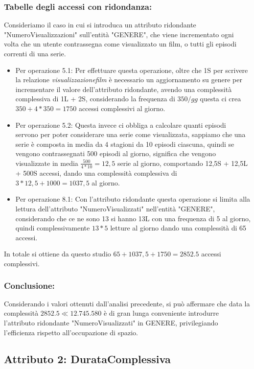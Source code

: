 \documentclass[a4paper,12pt]{report}
\begin{document}
\subsubsection{Tabelle degli accessi con ridondanza:}
Consideriamo il caso in cui si introduca un attributo ridondante "NumeroVisualizzazioni" sull'entità "GENERE", che viene incrementato ogni volta che un utente contrassegna come visualizzato un film, o tutti gli episodi correnti di una serie.
\begin{itemize}
	\item Per operazione 5.1: Per effettuare questa operazione, oltre che 1S per scrivere la relazione \textit{visualizzazionefilm} è necessario un aggiornamento su genere per incrementare il valore dell'attributo ridondante, avendo una complessità complessiva di 1L + 2S, considerando la frequenza di $350/gg$ questa ci crea $350 + 4 * 350 = 1750$ accessi complessivi al giorno.
	\item Per operazione 5.2: Questa invece ci obbliga a calcolare quanti episodi servono per poter considerare una serie come visualizzata, sappiamo che una serie è composta in media da 4 stagioni da 10 episodi ciascuna, quindi se vengono contrassegnati 500 episodi al giorno, significa che vengono visualizzate in media $\frac{500}{4 * 10} = 12,5$ serie al giorno, comportando 12,5S + 12,5L + 500S accessi, dando una complessità complessiva di $3 * 12,5 + 1000 = 1037,5$ al giorno.
	\item Per operazione 8.1: Con l'attributo ridondante questa operazione si limita alla lettura dell'attributo "NumeroVisualizzati" nell'entità "GENERE", considerando che ce ne sono 13 si hanno 13L con una frequenza di 5 al giorno, quindi complessivamente $13 * 5$ letture al giorno dando una complessità di 65 accessi.
\end{itemize}
In totale si ottiene da questo studio $65 + 1037,5 + 1750 = 2852.5$ accessi complessivi.
\subsubsection{Conclusione:}
Considerando i valori ottenuti dall'analisi precedente, si può affermare che data la complessità $2852.5 \ll 12.745.580$ è di gran lunga conveniente introdurre l'attributo ridondante "NumeroVisualizzati" in GENERE, privilegiando l'efficienza rispetto all'occupazione di spazio.

\subsection{Attributo 2: DurataComplessiva}
\end{document}

